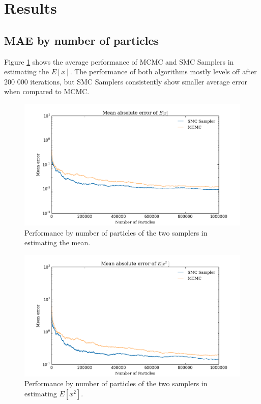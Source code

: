 \documentclass[12pt]{elsarticle}
\begin{document}
\section*{Results}

\subsection*{MAE by number of particles}
Figure \ref{ex} shows the average performance of MCMC and SMC Samplers in estimating the $E[x]$. The performance of both algorithms mostly levels off after 200 000 iterations, but SMC Samplers consistently show smaller average error when compared to MCMC. 


\begin{figure}[htbp]
\begin{center}
\includegraphics[width = \textwidth]{plots/E_X.png}
\caption{Performance by number of particles of the two samplers in estimating the mean.}
\label{ex}
\end{center}
\end{figure}

\begin{figure}[htbp]
\begin{center}
\includegraphics[width = \textwidth]{plots/E_X2.png}
\caption{Performance by number of particles of the two samplers in estimating $E[x^2]$.}
\label{default}
\end{center}
\end{figure}
\end{document}
